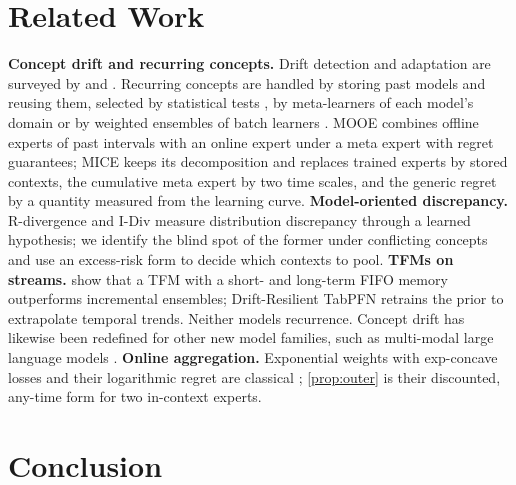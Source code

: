 \documentclass[11pt]{article}
\theoremstyle{plain}
\theoremstyle{definition}
\theoremstyle{remark}
\newcommand{\method}{\textsc{MICE}}   %
\begin{document}
\section{Related Work}
\label{sec:related}

\textbf{Concept drift and recurring concepts.} Drift detection and adaptation are surveyed by
\citet{gama2014survey} and \citet{lu2019learning}. Recurring concepts are handled by storing past models and
reusing them, selected by statistical tests \citep{goncalves2013rcd}, by meta-learners of each model's domain
\citep{gama2014recurrent} or by weighted ensembles of batch learners \citep{elwell2011nse}. MOOE
\citep{zhao2025mooe} combines offline experts of past intervals with an online expert under a meta expert with
regret guarantees; \method{} keeps its decomposition and replaces trained experts by stored contexts, the
cumulative meta expert by two time scales, and the generic regret by a quantity measured from the learning curve.
\textbf{Model-oriented discrepancy.} R-divergence \citep{zhao2023rdiv} and I-Div \citep{zhao2024idiv} measure
distribution discrepancy through a learned hypothesis; we identify the blind spot of the former under conflicting
concepts and use an excess-risk form to decide which contexts to pool. \textbf{TFMs on streams.}
\citet{lourenco2026streams} show that a TFM with a short- and long-term FIFO memory outperforms incremental
ensembles; Drift-Resilient TabPFN \citep{helli2024drift} retrains the prior to extrapolate temporal trends. Neither
models recurrence. Concept drift has likewise been redefined for other new model families, such as multi-modal
large language models \citep{yang2025adapting,yang2026turning}. \textbf{Online aggregation.} Exponential weights
with exp-concave losses and their logarithmic regret are classical \citep{cesabianchi2006prediction,hazan2007log};
\cref{prop:outer} is their discounted, any-time form for two in-context experts.

\section{Conclusion}
\label{sec:conclusion}
\end{document}
